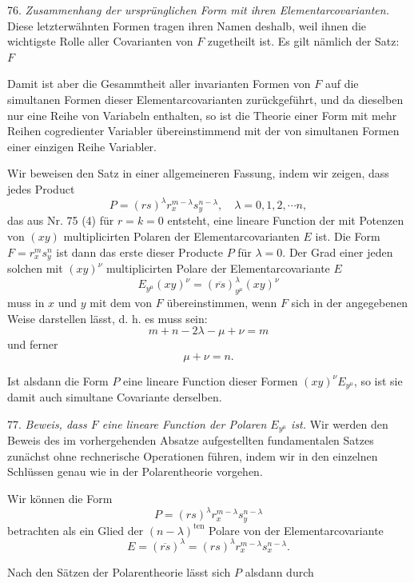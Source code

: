 
76. \textit{Zusammenhang der ursprünglichen Form mit ihren Elementarcovarianten.} Diese letzterwähnten Formen tragen ihren Namen deshalb, weil ihnen die wichtigste Rolle aller Covarianten von $F$ zugetheilt ist. Es gilt nämlich der Satz: \glqq {} $F$ \grqq

Damit ist aber die Gesammtheit aller invarianten Formen von $F$ auf die simultanen Formen dieser Elementarcovarianten zurückgeführt, und da dieselben nur eine Reihe von Variabeln enthalten, so ist die Theorie einer Form mit mehr Reihen cogredienter Variabler übereinstimmend mit der von simultanen Formen einer einzigen Reihe Variabler.

Wir beweisen den Satz in einer allgemeineren Fassung, indem wir zeigen, dass jedes Product
\[ P = (rs)^\lambda r_x^{m-\lambda} s_y^{n-\lambda}, \quad \lambda = 0, 1, 2, \cdots n, \]
das aus Nr. 75 (4) für $r=k=0$ entsteht, eine lineare Function der mit Potenzen von $(xy)$ multiplicirten Polaren der Elementarcovarianten $E$ ist. Die Form $F = r_x^m s_y^n$ ist dann das erste dieser Producte $P$ für $\lambda = 0$. Der Grad einer jeden solchen mit $(xy)^\nu$ multiplicirten Polare der Elementarcovariante $E$
\[ E_{y^\mu}(xy)^\nu = (\overline{rs})_{y^\mu}^\lambda (xy)^\nu \]
muss in $x$ und $y$ mit dem von $F$ übereinstimmen, wenn $F$ sich in der angegebenen Weise darstellen lässt, d. h. es muss sein:
\[ m+n-2\lambda-\mu+\nu = m \]
und ferner
\[ \mu+\nu = n. \]

Ist alsdann die Form $P$ eine lineare Function dieser Formen $(xy)^\nu E_{y^\mu}$, so ist sie damit auch simultane Covariante derselben.

77. \textit{Beweis, dass $F$ eine lineare Function der Polaren $E_{y^\mu}$ ist.} Wir werden den Beweis des im vorhergehenden Absatze aufgestellten fundamentalen Satzes zunächst ohne rechnerische Operationen führen, indem wir in den einzelnen Schlüssen genau wie in der Polarentheorie vorgehen.

Wir können die Form
\[ P = (rs)^\lambda r_x^{m-\lambda} s_y^{n-\lambda} \]
betrachten als ein Glied der $(n-\lambda)^{\text{ten}}$ Polare von der Elementarcovariante
\[ E = (\overline{rs})^\lambda = (rs)^\lambda r_x^{m-\lambda} s_x^{n-\lambda}. \]

Nach den Sätzen der Polarentheorie lässt sich $P$ alsdann durch



